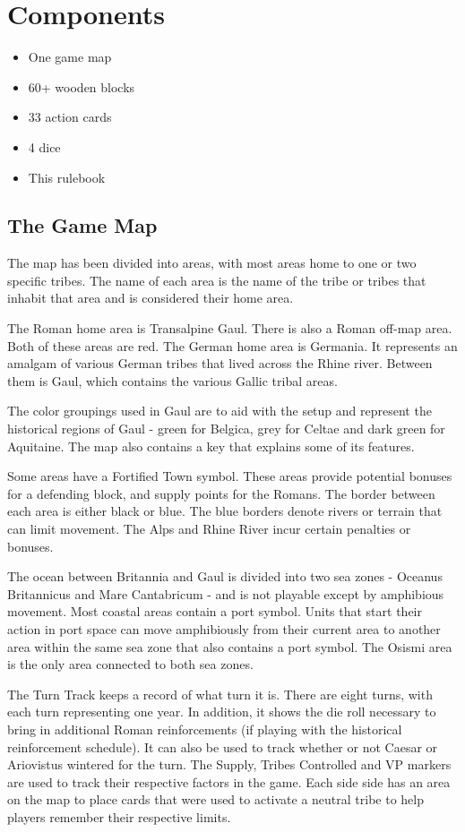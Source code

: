 \section{Components}

\begin{itemize}
  \setlength\itemsep{0em}
  \item One game map
  \item 60+ wooden blocks
  \item 33 action cards
  \item 4 dice
  \item This rulebook
\end{itemize}

\subsection{The Game Map}
The map has been divided into areas, with most areas home to one or two specific tribes. The name of each area is the name of the tribe or tribes that inhabit that area and is considered their home area.

The Roman home area is Transalpine Gaul. There is also a Roman off-map area. Both of these areas are red. The German home area is Germania. It represents an amalgam of various German tribes that lived across the Rhine river. Between them is Gaul, which contains the various Gallic tribal areas.

The color groupings used in Gaul are to aid with the setup and represent the historical regions of Gaul - green for Belgica, grey for Celtae and dark green for Aquitaine. The map also contains a key that explains some of its features.

Some areas have a Fortified Town symbol. These areas provide potential bonuses for a defending block, and supply points for the Romans. The border between each area is either black or blue. The blue borders denote rivers or terrain that can limit movement. The Alps and Rhine River incur certain penalties or bonuses.

The ocean between Britannia and Gaul is divided into two sea zones - Oceanus Britannicus and Mare Cantabricum - and is not playable except by amphibious movement. Most coastal areas contain a port symbol. Units that start their action in port space can move amphibiously from their current area to another area within the same sea zone that also contains a port symbol. The Osismi area is the only area connected to both sea zones.

The Turn Track keeps a record of what turn it is. There are eight turns, with each turn representing one year. In addition, it shows the die roll necessary to bring in additional Roman reinforcements (if playing with the historical reinforcement schedule). It can also be used to track whether or not Caesar or Ariovistus wintered for the turn. The Supply, Tribes Controlled and VP markers are used to track their respective factors in the game. Each side side has an area on the map to place cards that were used to activate a neutral tribe to help players remember their respective limits.

